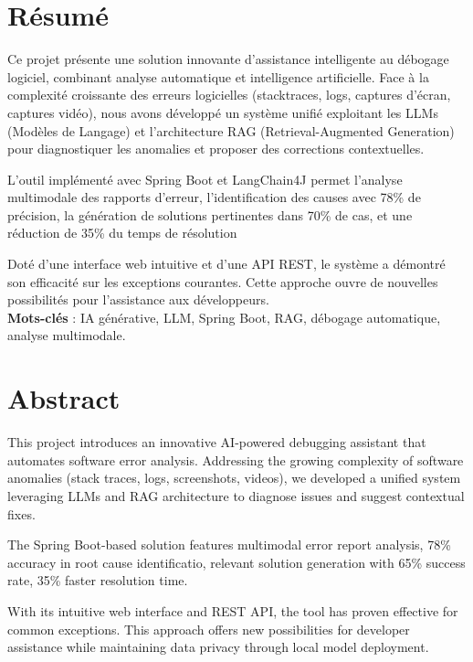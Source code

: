 \documentclass[12pt,a4paper]{report}
\begin{document}
	
	\clearpage
	\chapter*{Résumé}
	
	Ce projet présente une solution innovante d'assistance intelligente au débogage logiciel, combinant analyse automatique et intelligence artificielle. Face à la complexité croissante des erreurs logicielles (stacktraces, logs, captures d'écran, captures vidéo), nous avons développé un système unifié exploitant les LLMs (Modèles de Langage) et l'architecture RAG (Retrieval-Augmented Generation) pour diagnostiquer les anomalies et proposer des corrections contextuelles.
	
	L'outil implémenté avec Spring Boot et LangChain4J permet l'analyse multimodale des rapports d'erreur, l'identification des causes avec 78\% de précision, la génération de solutions pertinentes dans 70\% de cas, et une réduction de 35\% du temps de résolution
	
	Doté d'une interface web intuitive et d'une API REST, le système a démontré son efficacité sur les exceptions courantes. Cette approche ouvre de nouvelles possibilités pour l'assistance aux développeurs.\\[15em]
	
	\textbf{Mots-clés} : IA générative, LLM, Spring Boot, RAG, débogage automatique, analyse multimodale.

	\clearpage
	\chapter*{Abstract}
	
	This project introduces an innovative AI-powered debugging assistant that automates software error analysis. Addressing the growing complexity of software anomalies (stack traces, logs, screenshots, videos), we developed a unified system leveraging LLMs and RAG architecture to diagnose issues and suggest contextual fixes.
	
	The Spring Boot-based solution features multimodal error report analysis, 78\% accuracy in root cause identificatio, relevant solution generation with 65\% success rate, 35\% faster resolution time.
	
	With its intuitive web interface and REST API, the tool has proven effective for common exceptions. This approach offers new possibilities for developer assistance while maintaining data privacy through local model deployment.\\[18em]
	
\end{document}

